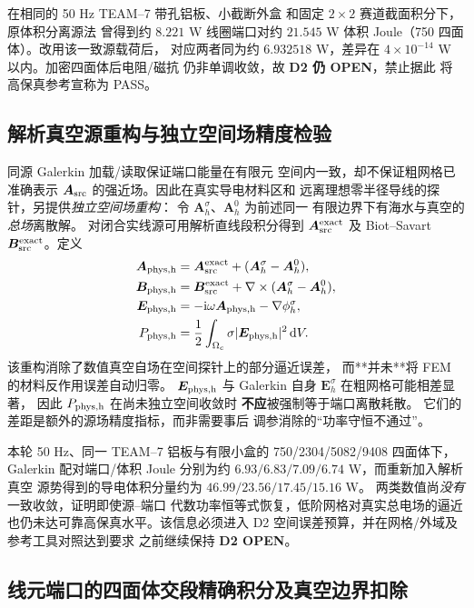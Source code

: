 在相同的 50 Hz TEAM--7 带孔铝板、小截断外盒
和固定 $2\times2$ 赛道截面积分下，原体积分离源法
曾得到约 $8.221$ W 线圈端口对约 $21.545$ W
体积 Joule（750 四面体）。改用该一致源载荷后，
对应两者同为约 $6.932518$ W，差异在
$4\times10^{-14}$ W 以内。加密四面体后电阻/磁抗
仍非单调收敛，故 \textbf{D2 仍 OPEN}，禁止据此
将高保真参考宣称为 PASS。

\subsection{解析真空源重构与独立空间场精度检验}
\label{sec:bfzi-d2-analytic-source-reconstruction}
同源 Galerkin 加载/读取保证端口能量在有限元
空间内一致，却不保证粗网格已准确表示
$\bm A_{\rm src}$ 的强近场。因此在真实导电材料区和
远离理想零半径导线的探针，另提供\emph{独立空间场重构}：
令 $\bm A_h^\sigma$、$\bm A_h^0$ 为前述同一
有限边界下有海水与真空的\emph{总场}离散解。
对闭合实线源可用解析直线段积分得到
$\bm A_{\rm src}^{\rm exact}$ 及 Biot--Savart
$\bm B_{\rm src}^{\rm exact}$。定义
\begin{align}
 \bm A_{\rm phys,h}
  &=\bm A_{\rm src}^{\rm exact}
       +(\bm A_h^\sigma-\bm A_h^0),\\
 \bm B_{\rm phys,h}
  &=\bm B_{\rm src}^{\rm exact}
       +\nabla\times(\bm A_h^\sigma-\bm A_h^0),\\
 \bm E_{\rm phys,h}
  &=-\mathrm i\omega\bm A_{\rm phys,h}-\nabla\phi_h^\sigma,\\
 P_{\rm phys,h}
  &=\frac12\int_{\Omega_c}\sigma|\bm E_{\rm phys,h}|^2\,\mathrm dV.
\end{align}
该重构消除了数值真空自场在空间探针上的部分逼近误差，
而**并未**将 FEM 的材料反作用误差自动归零。
$\bm E_{\rm phys,h}$ 与 Galerkin 自身
$\bm E_h^\sigma$ 在粗网格可能相差显著，
因此 $P_{\rm phys,h}$ 在尚未独立空间收敛时
\textbf{不应}被强制等于端口离散耗散。
它们的差距是额外的源场精度指标，而非需要事后
调参消除的“功率守恒不通过”。

本轮 50 Hz、同一 TEAM--7 铝板与有限小盒的
750/2304/5082/9408 四面体下，
Galerkin 配对端口/体积 Joule 分别为约
$6.93/6.83/7.09/6.74$ W，而重新加入解析真空
源势得到的导电体积分量约为
$46.99/23.56/17.45/15.16$ W。
两类数值尚\emph{没有}一致收敛，证明即使源--端口
代数功率恒等式恢复，低阶网格对真实总电场的逼近
也仍未达可靠高保真水平。该信息必须进入 D2
空间误差预算，并在网格/外域及参考工具对照达到要求
之前继续保持 \textbf{D2 OPEN}。

\subsection{线元端口的四面体交段精确积分及真空边界扣除}

